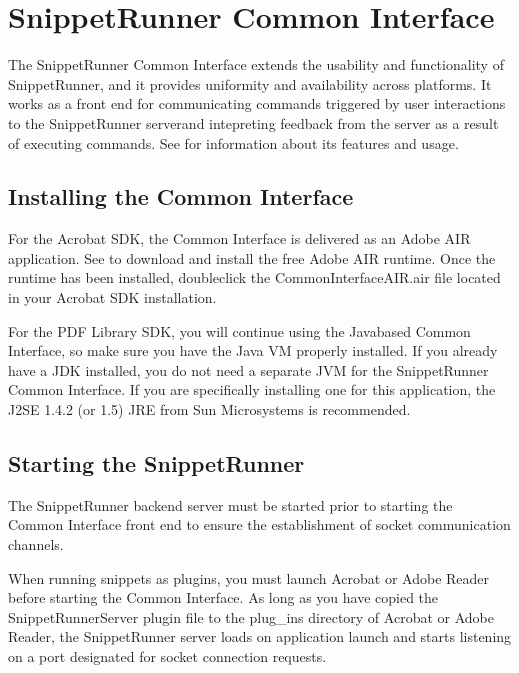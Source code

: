 \documentclass[letterpaper,12pt,english,openany,oneside]{sphinxmanual}
\begin{document}
\section{SnippetRunner Common Interface}
\label{\detokenize{Snippet_SnippetRunnerCookbook:snippetrunner-common-interface}}
The SnippetRunner Common Interface extends the usability and functionality of SnippetRunner, and it provides uniformity and availability across platforms. It works as a front end for communicating commands triggered by user interactions to the SnippetRunner serverand intepreting feedback from the server as a result of executing commands. See  for information about its features and usage.


\subsection{Installing the Common Interface}
\label{\detokenize{Snippet_SnippetRunnerCookbook:installing-the-common-interface}}
For the Acrobat SDK, the Common Interface is delivered as an Adobe AIR application. See  to download and install the free Adobe AIR runtime. Once the runtime has been installed, double\sphinxhyphen{}click the CommonInterfaceAIR.air file located in your Acrobat SDK installation.

For the PDF Library SDK, you will continue using the Java\sphinxhyphen{}based Common Interface, so make sure you have the Java VM properly installed. If you already have a JDK installed, you do not need a separate JVM for the SnippetRunner Common Interface. If you are specifically installing one for this application, the J2SE 1.4.2 (or 1.5) JRE from Sun Microsystems is recommended.


\subsection{Starting the SnippetRunner}
\label{\detokenize{Snippet_SnippetRunnerCookbook:starting-the-snippetrunner}}
The SnippetRunner back\sphinxhyphen{}end server must be started prior to starting the Common Interface front end to ensure the establishment of socket communication channels.

When running snippets as plug\sphinxhyphen{}ins, you must launch Acrobat or Adobe Reader before starting the Common Interface. As long as you have copied the SnippetRunnerServer plug\sphinxhyphen{}in file to the plug\_ins directory of Acrobat or Adobe Reader, the SnippetRunner server loads on application launch and starts listening on a port designated for socket connection requests.
\end{document}
